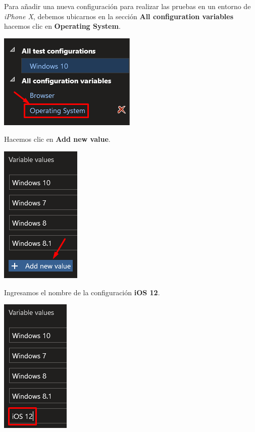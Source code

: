 \documentclass{elsarticle}
\begin{document}
Para añadir una nueva configuración para realizar las pruebas en un entorno de \textit{iPhone X}, debemos ubicarnos en la sección \textbf{All configuration variables} hacemos clic en \textbf{Operating System}.
\begin{center}
	\includegraphics{img/Screenshot_34.png}
\end{center}

Hacemos clic en \textbf{Add new value}.
\begin{center}
	\includegraphics{img/Screenshot_35.png}
\end{center}

Ingresamos el nombre de la configuración \textbf{iOS 12}.
\begin{center}
	\includegraphics{img/Screenshot_36.png}
\end{center}
\end{document}
